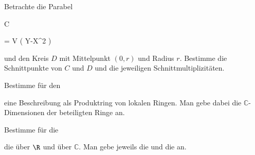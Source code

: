 {} {}



{}

{


Betrachte die Parabel


\mavergleichskette

{\vergleichskette

{ C
}

{ = }{ V \left(  Y-X^2  \right)
}

{  }{
}

{    }{
}

{   }{
}

}
{}{}{}
und den Kreis $D$ mit Mittelpunkt $(0,r)$ und Radius $r$. Bestimme die Schnittpunkte von $C$ und $D$ und die jeweiligen Schnittmultiplizitäten.


}

{} {}



{}

{


Bestimme für den


 {} {}
eine Beschreibung als Produktring von lokalen Ringen. Man gebe dabei die ${\mathbb C}$-Dimensionen der beteiligten Ringe an.


}

{} {}



{}

{


Bestimme für die


 die
über $\R$ und über ${\mathbb C}$. Man gebe jeweils die
und die
an.


}

{} {}



